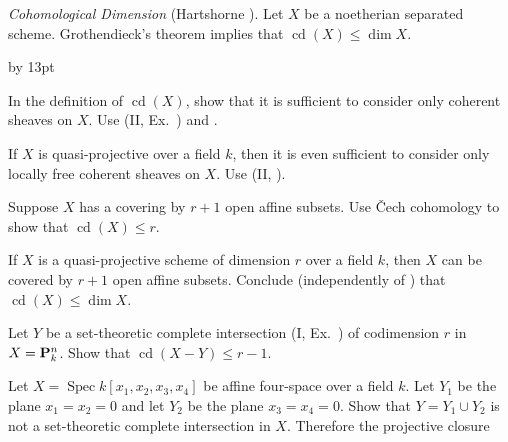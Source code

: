 {{\smallskip
\noindent\hypertarget{ex-III-4.8}{}\emph{Cohomological Dimension} (Hartshorne ). Let $X$ be a noetherian separated scheme.
Grothendieck's theorem  implies that $\operatorname{cd}(X)\leq\dim X$.
{\advance\leftskip by 13pt\par
\noindent\hypertarget{ex-III-4.8a}{}In the definition of $\operatorname{cd}(X)$, show that it is sufficient to consider only coherent sheaves on $X$. Use (II, Ex.~) and .

\noindent\hypertarget{ex-III-4.8b}{}If $X$ is quasi-projective over a field $k$, then it is even sufficient to consider only locally free coherent sheaves on $X$. Use (II, ).

\noindent\hypertarget{ex-III-4.8c}{}Suppose $X$ has a covering by $r+1$ open affine subsets. Use \v{C}ech cohomology to show that $\operatorname{cd}(X)\leq r$.

\noindent\hypertarget{ex-III-4.8d}{}If $X$ is a quasi-projective scheme of dimension $r$ over a field $k$, then $X$ can be covered by $r+1$ open affine subsets. Conclude (independently of ) that $\operatorname{cd}(X)\leq\dim X$.

\noindent\hypertarget{ex-III-4.8e}{}Let $Y$ be a set-theoretic complete intersection (I, Ex.~) of codimension $r$ in $X=\mathbf{P}_k^n$. Show that $\operatorname{cd}(X-Y)\leq r-1$.\par}

\smallskip
\noindent\hypertarget{ex-III-4.9}{}Let $X=\operatorname{Spec}k[x_1,x_2,x_3,x_4]$ be affine four-space over a field $k$. Let $Y_1$ be the plane $x_1=x_2=0$ and let $Y_2$ be the plane $x_3=x_4=0$. Show that $Y=Y_1\cup Y_2$ is not a set-theoretic complete intersection in $X$. Therefore the projective closure\par}
}

